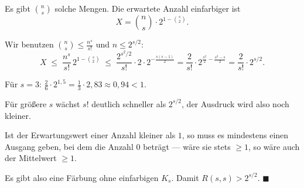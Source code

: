 \begin{aufgabe}
Es gibt $\binom{n}{s}$ solche Mengen. Die erwartete Anzahl einfarbiger ist
\[ X = \binom{n}{s} \cdot 2^{1-\binom{s}{2}} . \]

Wir benutzen $\binom{n}{s} \le \frac{n^s}{s!}$ und $n \le 2^{s/2}$:
\[ X \;\le\; \frac{n^s}{s!}\, 2^{1-\binom{s}{2}} \;\le\; \frac{2^{s^2/2}}{s!} \cdot 2 \cdot 2^{-\frac{s(s-1)}{2}} = \frac{2}{s!}\cdot 2^{\frac{s^2}{2} - \frac{s^2-s}{2}} = \frac{2}{s!} \cdot 2^{s/2} . \]

Für $s = 3$: $\frac{2}{6}\cdot 2^{1{,}5} = \frac13 \cdot 2{,}83 \approx 0{,}94 < 1$. \checkmark

Für größere $s$ wächst $s!$ deutlich schneller als $2^{s/2}$, der Ausdruck wird also noch kleiner.

Ist der Erwartungswert einer Anzahl kleiner als $1$, so muss es mindestens einen Ausgang geben, bei dem die Anzahl $0$ beträgt --- wäre sie stets $\ge 1$, so wäre auch der Mittelwert $\ge 1$.

Es gibt also eine Färbung ohne einfarbigen $K_s$. Damit $R(s,s) > 2^{s/2}$. $\blacksquare$

\begin{center}
\begin{minipage}{0.86\textwidth}
\end{minipage}
\end{center}
\end{aufgabe}

